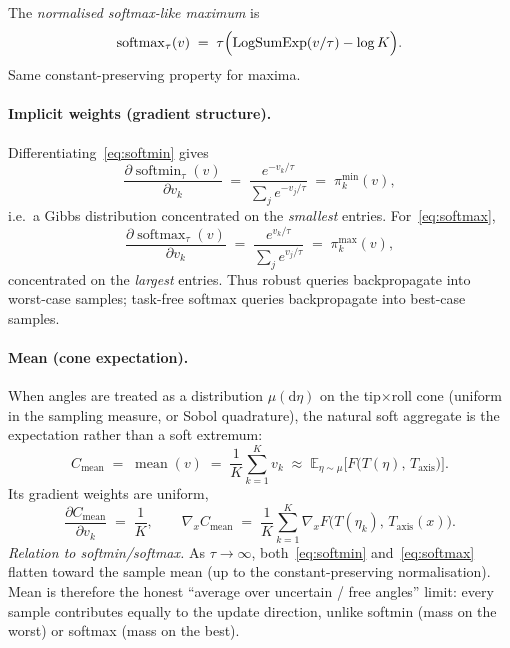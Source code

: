 \documentclass[11pt,a4paper]{article}
\newcommand{\Taxis}{T_{\mathrm{axis}}}
\newcommand{\softmin}{\operatorname{softmin}}
\newcommand{\softmax}{\operatorname{softmax}}
\newcommand{\LogSumExp}{\operatorname{LogSumExp}}
\begin{document}
The \emph{normalised softmax-like maximum} is
\begin{equation}
\label{eq:softmax}
  \softmax_{\tau}(v)
  \;=\;
  \tau\Bigl(
    \LogSumExp(v/\tau)
    -
    \log K
  \Bigr).
\end{equation}
Same constant-preserving property for maxima.

\paragraph{Implicit weights (gradient structure).}
Differentiating~\eqref{eq:softmin} gives
\begin{equation}
\label{eq:softmin-grad}
  \frac{\partial\softmin_{\tau}(v)}{\partial v_{k}}
  \;=\;
  \frac{e^{-v_{k}/\tau}}{\sum_{j}e^{-v_{j}/\tau}}
  \;=\;
  \pi_{k}^{\mathrm{min}}(v),
\end{equation}
i.e.\ a Gibbs distribution concentrated on the \emph{smallest} entries.
For~\eqref{eq:softmax},
\begin{equation}
\label{eq:softmax-grad}
  \frac{\partial\softmax_{\tau}(v)}{\partial v_{k}}
  \;=\;
  \frac{e^{v_{k}/\tau}}{\sum_{j}e^{v_{j}/\tau}}
  \;=\;
  \pi_{k}^{\mathrm{max}}(v),
\end{equation}
concentrated on the \emph{largest} entries. Thus robust queries backpropagate
into worst-case samples; task-free softmax queries backpropagate into best-case
samples.

\paragraph{Mean (cone expectation).}
When angles are treated as a distribution \(\mu(\mathrm{d}\eta)\) on the tip$\times$roll
cone (uniform in the sampling measure, or Sobol quadrature), the natural soft
aggregate is the expectation rather than a soft extremum:
\begin{equation}
\label{eq:mean}
  C_{\mathrm{mean}}
  \;=\;
  \operatorname{mean}(v)
  \;=\;
  \frac{1}{K}\sum_{k=1}^{K} v_{k}
  \;\approx\;
  \mathbb{E}_{\eta\sim\mu}\bigl[F\bigl(T(\eta),\,\Taxis\bigr)\bigr].
\end{equation}
Its gradient weights are uniform,
\begin{equation}
\label{eq:mean-grad}
  \frac{\partial C_{\mathrm{mean}}}{\partial v_{k}}
  \;=\;
  \frac{1}{K},
  \qquad
  \nabla_{x} C_{\mathrm{mean}}
  \;=\;
  \frac{1}{K}\sum_{k=1}^{K}
  \nabla_{x} F\bigl(T(\eta_{k}),\,\Taxis(x)\bigr).
\end{equation}
\emph{Relation to softmin/softmax.}
As \(\tau\to\infty\), both~\eqref{eq:softmin} and~\eqref{eq:softmax} flatten
toward the sample mean (up to the constant-preserving normalisation).
Mean is therefore the honest ``average over uncertain / free angles'' limit:
every sample contributes equally to the update direction, unlike softmin
(mass on the worst) or softmax (mass on the best).
\end{document}
